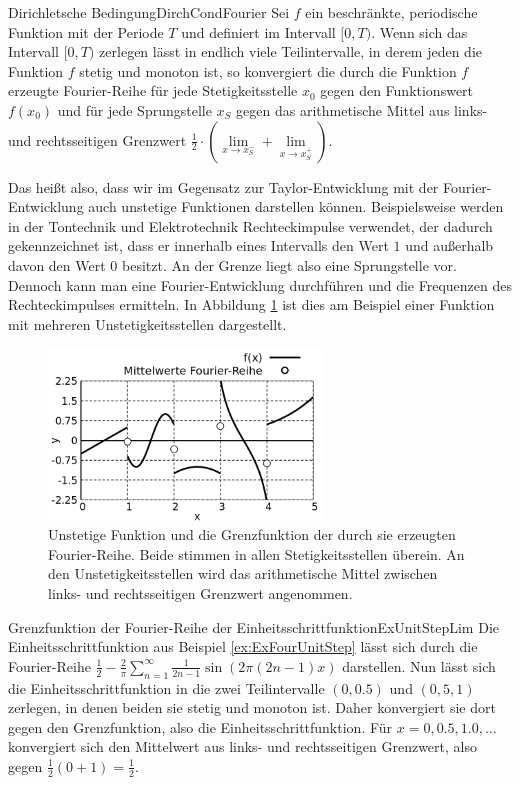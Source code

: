\begin{statement}{Dirichletsche Bedingung}{DirchCondFourier}
    Sei $f$ ein beschränkte, periodische Funktion mit der Periode $T$ und definiert im Intervall $[0,T)$. Wenn sich das Intervall $[0,T)$ zerlegen lässt in endlich viele Teilintervalle, in derem jeden die Funktion $f$ stetig und monoton ist, so konvergiert die durch die Funktion $f$ erzeugte Fourier-Reihe für jede Stetigkeitsstelle $x_0$ gegen den Funktionswert $f(x_0)$ und für jede Sprungstelle $x_S$ gegen das arithmetische Mittel aus links- und rechtsseitigen Grenzwert $\frac{1}{2} \cdot \left(\lim\limits_{x\to x_S^-} + \lim\limits_{x\to x_S^+}\right)$.
\end{statement}

Das heißt also, dass wir im Gegensatz zur Taylor-Entwicklung mit der Fourier-Entwicklung auch unstetige Funktionen darstellen können. Beispielsweise werden in der Tontechnik und Elektrotechnik Rechteckimpulse verwendet, der dadurch gekennzeichnet ist, dass er innerhalb eines Intervalls den Wert $1$ und außerhalb davon den Wert $0$ besitzt. An der Grenze liegt also eine Sprungstelle vor. Dennoch kann man eine Fourier-Entwicklung durchführen und die Frequenzen des Rechteckimpulses ermitteln. In Abbildung \ref{fig:ExFourierDirichlet} ist dies am Beispiel einer Funktion mit mehreren Unstetigkeitsstellen dargestellt.

\begin{figure}
    \centering
    \includegraphics[width=0.65\textwidth]{./gnuplot/fourier-dirichlet}
    \caption[Fourier-Reihe einer unstetigen Funktion]{Unstetige Funktion und die Grenzfunktion der durch sie erzeugten Fourier-Reihe. Beide stimmen in allen Stetigkeitsstellen überein. An den Unstetigkeitsstellen wird das arithmetische Mittel zwischen links- und rechtsseitigen Grenzwert angenommen.}
    \label{fig:ExFourierDirichlet}
\end{figure}

\begin{example}{Grenzfunktion der Fourier-Reihe der Einheitsschrittfunktion}{ExUnitStepLim}
    Die Einheitsschrittfunktion aus Beispiel \ref{ex:ExFourUnitStep} lässt sich durch die Fourier-Reihe $\frac{1}{2} - \frac{2}{\pi} \sum\limits_{n=1}^\infty \frac{1}{2n-1} \sin(2\pi (2n-1) x)$ darstellen. Nun lässt sich die Einheitsschrittfunktion in die zwei Teilintervalle $(0, 0.5)$ und $(0,5, 1)$ zerlegen, in denen beiden sie stetig und monoton ist. Daher konvergiert sie dort gegen den Grenzfunktion, also die Einheitsschrittfunktion. Für $x=0,0.5,1.0,\dots$ konvergiert sich den Mittelwert aus links- und rechtsseitigen Grenzwert, also gegen $\frac{1}{2} (0+1) = \frac{1}{2}$.
\end{example}

